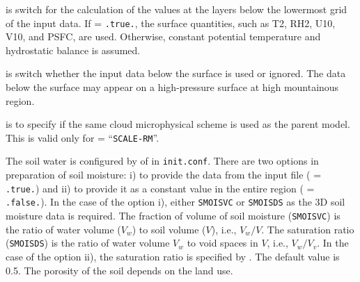  is switch for the calculation of the values at the layers below the lowermost grid of the input data.
If  = \verb|.true.|, the surface quantities, such as T2, RH2, U10, V10, and PSFC, are used.
Otherwise, constant potential temperature and hydrostatic balance is assumed.

 is switch whether the input data below the surface is used or ignored.
The data below the surface may appear on a high-pressure surface at high mountainous region.

 is to specify if the same cloud microphysical scheme is used as the parent model.
This is valid only for  = ``\verb|SCALE-RM|''.


The soil water is configured by  of  in \verb|init.conf|.
There are two options in preparation of soil moisture: i) to provide the data from the input file ( = \verb|.true.|) and ii) to provide it as a constant value in the entire region ( = \verb|.false.|).
In the case of the option i), either \verb|SMOISVC| or \verb|SMOISDS| as the 3D soil moisture data is required.
The fraction of volume of soil moisture (\verb|SMOISVC|) is the ratio of water volume ($V_w$) to soil volume ($V$), i.e., $V_w / V$.
The saturation ratio (\verb|SMOISDS|) is the ratio of water volume $V_w$ to void spaces in $V$, i.e., $V_w / V_v$.
%
In the case of the option ii), the saturation ratio is specified by .
The default value is 0.5.
The porosity of the soil depends on the land use.




